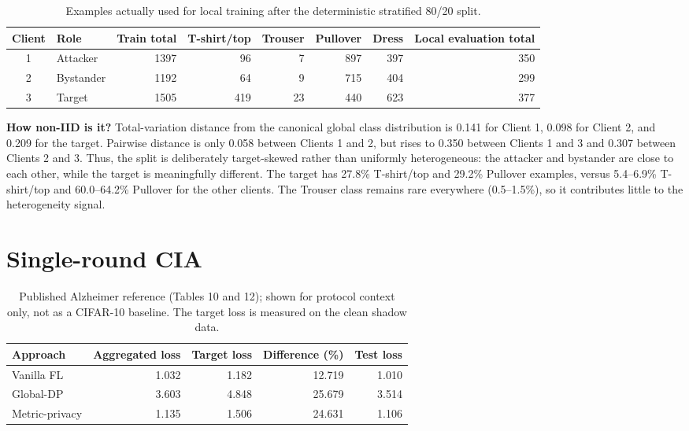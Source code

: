 \documentclass[10pt]{article}
\begin{document}
\begin{table}[h]
\centering
\caption{Examples actually used for local training after the deterministic stratified 80/20 split.}
\begin{tabular}{clrrrrrr}
\toprule
Client & Role & Train total & T-shirt/top & Trouser & Pullover & Dress & Local evaluation total \\
\midrule
1 & Attacker & 1397 & 96 & 7 & 897 & 397 & 350 \\
2 & Bystander & 1192 & 64 & 9 & 715 & 404 & 299 \\
3 & Target & 1505 & 419 & 23 & 440 & 623 & 377 \\
\bottomrule
\end{tabular}
\end{table}

\textbf{How non-IID is it?} Total-variation distance from the canonical global class distribution is
0.141 for Client 1, 0.098 for Client 2, and 0.209 for the target.
Pairwise distance is only 0.058 between Clients 1 and 2, but rises to
0.350 between Clients 1 and 3 and 0.307 between Clients 2 and 3.
Thus, the split is deliberately target-skewed rather than uniformly heterogeneous: the attacker and
bystander are close to each other, while the target is meaningfully different. The target has 27.8\% T-shirt/top
and 29.2\% Pullover examples, versus 5.4--6.9\% T-shirt/top and 60.0--64.2\% Pullover for the other clients.
The Trouser class remains rare everywhere (0.5--1.5\%), so it contributes little to the heterogeneity signal.

\section*{Single-round CIA}

\begin{table}[h]
\centering
\caption{Published Alzheimer reference (Tables 10 and 12); shown for protocol context only, not as a CIFAR-10 baseline. The target loss is measured on the clean shadow data.}
\begin{tabular}{lrrrr}
\toprule
Approach & Aggregated loss & Target loss & Difference (\%) & Test loss \\
\midrule
Vanilla FL & 1.032 & 1.182 & 12.719 & 1.010 \\
Global-DP & 3.603 & 4.848 & 25.679 & 3.514 \\
Metric-privacy & 1.135 & 1.506 & 24.631 & 1.106 \\
\bottomrule
\end{tabular}
\end{table}
\end{document}
